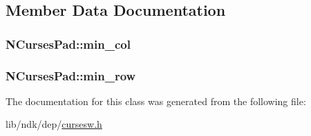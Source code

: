 \subsection{Member Data Documentation}
\hypertarget{class_n_curses_pad_ac636d841416a8a7357d050818be1f609}{
\subsubsection[{min\-\_\-col}]{ N\-Curses\-Pad\-::min\-\_\-col\hspace{0.3cm}{\ttfamily [protected]}}}\label{class_n_curses_pad_ac636d841416a8a7357d050818be1f609}
\hypertarget{class_n_curses_pad_a6115be549d8b7bfdb24dcf8a740faf97}{
\subsubsection[{min\-\_\-row}]{ N\-Curses\-Pad\-::min\-\_\-row\hspace{0.3cm}{\ttfamily [protected]}}}\label{class_n_curses_pad_a6115be549d8b7bfdb24dcf8a740faf97}


The documentation for this class was generated from the following file\-:\begin{DoxyCompactItemize}
\item 
lib/ndk/dep/\hyperlink{cursesw_8h}{cursesw.\-h}\end{DoxyCompactItemize}
